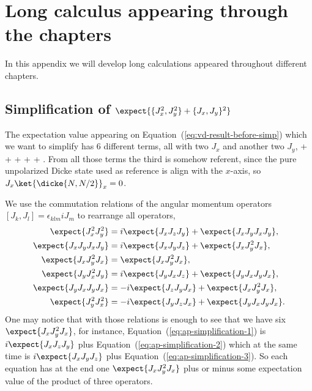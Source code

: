 \section{Long calculus appearing through the chapters}
\label{app:longcacl}

In this appendix we will develop long calculations appeared throughout different chapters.

\subsection[Simplification of the Eq.~{(\ref{eq:vd-result-before-simp})}]
{Simplification of $\expect{\{J_x^2,J_y^2\}+\{J_x,J_y\}^2}$}
\label{ap:loca-simplification}

The expectation value appearing on Equation~{(\ref{eq:vd-result-before-simp})} which we want to simplify has 6 different terms, all with two $J_x$ and another two $J_y$,
\be
   +  + 
  +  +  + .
\ee
From all those terms the third is somehow referent, since the pure unpolarized Dicke state used as reference is align with the $x$-axis, so $J_x\ket{\dicke{N,N/2}}_x=0$.

We use the commutation relations of the angular momentum operators $[J_k,J_l]=\epsilon_{klm} iJ_m$ to rearrange all operators,
\begin{subequations}
\begin{align}
  \expect{J_x^2J_y^2} & = i\expect{J_xJ_zJ_y}+\expect{J_xJ_yJ_xJ_y},
  \label{eq:ap-simplification-1} \\
  \expect{J_xJ_yJ_xJ_y} & = i\expect{J_xJ_yJ_z}+\expect{J_xJ_y^2J_x},
  \label{eq:ap-simplification-2} \\
  \expect{J_xJ_y^2J_x} & = \expect{J_xJ_y^2J_x},
  \label{eq:ap-simplification-3} \\
  \expect{J_yJ_x^2J_y} & = i\expect{J_yJ_xJ_z} + \expect{J_yJ_xJ_yJ_x},
  \label{eq:ap-simplification-4} \\
  \expect{J_yJ_xJ_yJ_x} & = -i\expect{J_zJ_yJ_x} + \expect{J_xJ_y^2J_x},
  \label{eq:ap-simplification-5} \\
  \expect{J_y^2J_x^2} & = -i\expect{J_yJ_zJ_x} + \expect{J_yJ_xJ_yJ_x}.
  \label{eq:ap-simplification-6}
\end{align}
\end{subequations}
One may notice that with those relations is enough to see that we have six $\expect{J_xJ_y^2J_x}$, for instance, Equation~{(\ref{eq:ap-simplification-1})} is $i\expect{J_xJ_zJ_y}$ plus Equation~{(\ref{eq:ap-simplification-2})} which at the same time is $i\expect{J_xJ_yJ_z}$ plus Equation~{(\ref{eq:ap-simplification-3})}.
So each equation has at the end one $\expect{J_xJ_y^2J_x}$ plus or minus some expectation value of the product of three operators.

